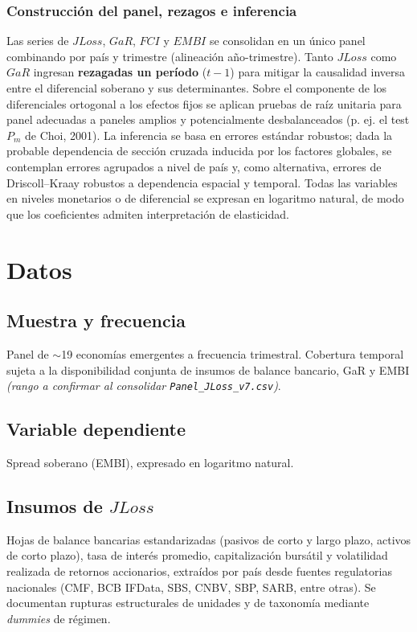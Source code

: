 \documentclass[5p,times,twocolumn,authoryear]{elsarticle}
\begin{document}
\subsubsection{Construcción del panel, rezagos e inferencia}

Las series de $JLoss$, $GaR$, $FCI$ y $EMBI$ se consolidan en un único panel combinando por país y trimestre (alineación año-trimestre). Tanto $JLoss$ como $GaR$ ingresan \textbf{rezagadas un período} ($t-1$) para mitigar la causalidad inversa entre el diferencial soberano y sus determinantes. Sobre el componente de los diferenciales ortogonal a los efectos fijos se aplican pruebas de raíz unitaria para panel adecuadas a paneles amplios y potencialmente desbalanceados (p. ej. el test $P_m$ de Choi, 2001). La inferencia se basa en errores estándar robustos; dada la probable dependencia de sección cruzada inducida por los factores globales, se contemplan errores agrupados a nivel de país y, como alternativa, errores de Driscoll–Kraay robustos a dependencia espacial y temporal. Todas las variables en niveles monetarios o de diferencial se expresan en logaritmo natural, de modo que los coeficientes admiten interpretación de elasticidad.


\section{Datos}

\subsection{Muestra y frecuencia}
Panel de $\sim$19 economías emergentes a frecuencia trimestral. Cobertura temporal sujeta a la disponibilidad conjunta de insumos de balance bancario, GaR y EMBI \textit{(rango a confirmar al consolidar \texttt{Panel\_JLoss\_v7.csv})}.

\subsection{Variable dependiente}
Spread soberano (EMBI), expresado en logaritmo natural.

\subsection{Insumos de $JLoss$}
Hojas de balance bancarias estandarizadas (pasivos de corto y largo plazo, activos de corto plazo), tasa de interés promedio, capitalización bursátil y volatilidad realizada de retornos accionarios, extraídos por país desde fuentes regulatorias nacionales (CMF, BCB IFData, SBS, CNBV, SBP, SARB, entre otras). Se documentan rupturas estructurales de unidades y de taxonomía mediante \textit{dummies} de régimen.
\end{document}
